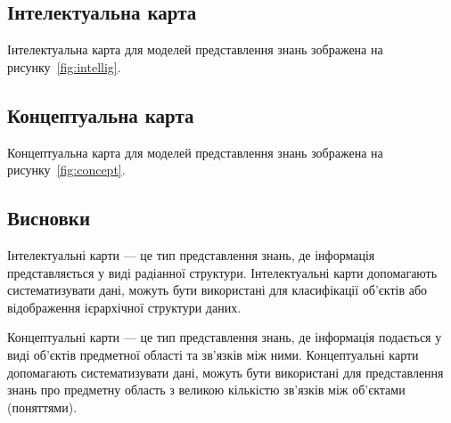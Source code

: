 



\newcommand{\tasknumber}{2} %



\usepackage{lscape}
\usepackage{appendix}

\graphicspath{{figures/}}


\Ukrainian


\addtocounter{page}{1}

\subsection{Інтелектуальна карта}
Інтелектуальна карта для моделей представлення знань зображена на рисунку~\ref{fig:intellig}.

\subsection{Концептуальна карта}
Концептуальна карта для моделей представлення знань зображена на рисунку~\ref{fig:concept}.

\subsection*{Висновки}
Інтелектуальні карти --- це тип представлення знань, де інформація представляється у виді радіанної структури. 
Інтелектуальні карти допомагають систематизувати дані, можуть бути використані для класифікації об’єктів або відображення ієрархічної структури даних.

Концептуальні карти --- це тип представлення знань, де інформація подається у виді об’єктів предметної області та зв’язків між ними. 
Концептуальні карти допомагають систематизувати дані, можуть бути використані для представлення знань про предметну область з великою кількістю зв’язків між об’єктами (поняттями). 

\begin{appendices}
    \newcommand\appendixsection[1]{
        \addtocounter{section}{1}
        \clearpage
        \section*{Додаток \thesection. #1}
        \addcontentsline{toc}{section}{Додаток \thesection. #1}
    }
    
    
 \end{appendices}


